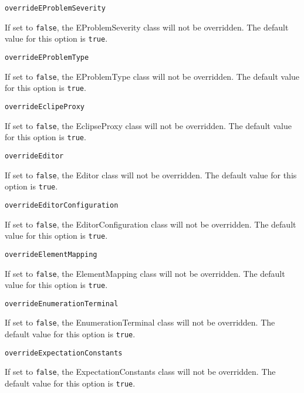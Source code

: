 \noindent\texttt{overrideEProblemSeverity}
\begin{myindentpar}{1cm}
If set to \texttt{false}, the EProblemSeverity class will not be overridden. The default value for this option is \texttt{true}.
\end{myindentpar}

\noindent\texttt{overrideEProblemType}
\begin{myindentpar}{1cm}
If set to \texttt{false}, the EProblemType class will not be overridden. The default value for this option is \texttt{true}.
\end{myindentpar}

\noindent\texttt{overrideEclipeProxy}
\begin{myindentpar}{1cm}
If set to \texttt{false}, the EclipseProxy class will not be overridden. The default value for this option is \texttt{true}.
\end{myindentpar}

\noindent\texttt{overrideEditor}
\begin{myindentpar}{1cm}
If set to \texttt{false}, the Editor class will not be overridden. The default value for this option is \texttt{true}.
\end{myindentpar}

\noindent\texttt{overrideEditorConfiguration}
\begin{myindentpar}{1cm}
If set to \texttt{false}, the EditorConfiguration class will not be overridden. The default value for this option is \texttt{true}.
\end{myindentpar}

\noindent\texttt{overrideElementMapping}
\begin{myindentpar}{1cm}
If set to \texttt{false}, the ElementMapping class will not be overridden. The default value for this option is \texttt{true}.
\end{myindentpar}

\noindent\texttt{overrideEnumerationTerminal}
\begin{myindentpar}{1cm}
If set to \texttt{false}, the EnumerationTerminal class will not be overridden. The default value for this option is \texttt{true}.
\end{myindentpar}

\noindent\texttt{overrideExpectationConstants}
\begin{myindentpar}{1cm}
If set to \texttt{false}, the ExpectationConstants class will not be overridden. The default value for this option is \texttt{true}.
\end{myindentpar}

